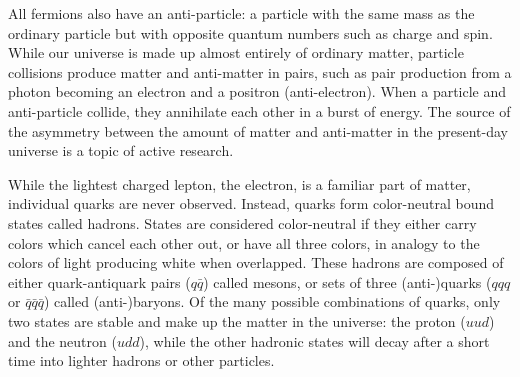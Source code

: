 All fermions also have an anti-particle: a particle with the same mass as the ordinary particle but with opposite quantum numbers such as charge and spin.  While our universe is made up almost entirely of ordinary matter, particle collisions produce matter and anti-matter in pairs, such as pair production from a photon becoming an electron and a positron (anti-electron).  When a particle and anti-particle collide, they annihilate each other in a burst of energy.  The source of the asymmetry between the amount of matter and anti-matter in the present-day universe is a topic of active research. 

While the lightest charged lepton, the electron, is a familiar part of matter, individual quarks are never observed.  Instead, quarks form color-neutral bound states called hadrons.  States are considered color-neutral if they either carry colors which cancel each other out, or have all three colors, in analogy to the colors of light producing white when overlapped.  These hadrons are composed of either quark-antiquark pairs ($q\bar{q}$) called mesons, or sets of three (anti-)quarks ($qqq$ or $\bar{q}\bar{q}\bar{q}$) called (anti-)baryons.  Of the many possible combinations of quarks, only two states are stable and make up the matter in the universe: the proton ($uud$) and the neutron ($udd$), while the other hadronic states will decay after a short time into lighter hadrons or other particles.                                                                                                                                                                                                                                                                                                                                                                                                                                                                                                                                                                                                                                                                                                                                                                                                                                                                                                                                                                                                                                                                                                                                                                                                                                                                                                                                                                                                                                                                                                                                                                                                                                                                                                                                                                                                                                                                                                                                         